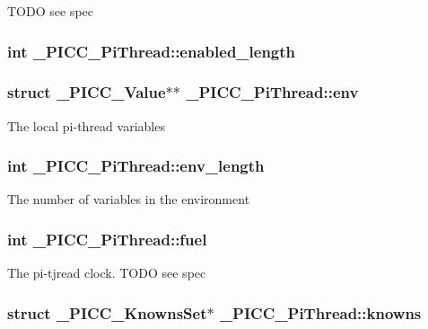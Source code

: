 T\-O\-D\-O see spec \hypertarget{struct__PICC__PiThread_a0443e5525ef66064fbfb5ea4722f0fda}{
\subsubsection[{enabled\-\_\-length}]{\setlength{\rightskip}{0pt plus 5cm}int \-\_\-\-P\-I\-C\-C\-\_\-\-Pi\-Thread\-::enabled\-\_\-length}}\label{struct__PICC__PiThread_a0443e5525ef66064fbfb5ea4722f0fda}
\hypertarget{struct__PICC__PiThread_a2ad1dca93b2d7b8227d400a5f0fd5003}{
\subsubsection[{env}]{\setlength{\rightskip}{0pt plus 5cm}struct {\bf \-\_\-\-P\-I\-C\-C\-\_\-\-Value}$\ast$$\ast$ \-\_\-\-P\-I\-C\-C\-\_\-\-Pi\-Thread\-::env}}\label{struct__PICC__PiThread_a2ad1dca93b2d7b8227d400a5f0fd5003}
The local pi-\/thread variables \hypertarget{struct__PICC__PiThread_a8fce59a9f1cf87c981af443cba62fb86}{
\subsubsection[{env\-\_\-length}]{\setlength{\rightskip}{0pt plus 5cm}int \-\_\-\-P\-I\-C\-C\-\_\-\-Pi\-Thread\-::env\-\_\-length}}\label{struct__PICC__PiThread_a8fce59a9f1cf87c981af443cba62fb86}
The number of variables in the environment \hypertarget{struct__PICC__PiThread_ade9af8e74e38619a991f6881a0ff2e1e}{
\subsubsection[{fuel}]{\setlength{\rightskip}{0pt plus 5cm}int \-\_\-\-P\-I\-C\-C\-\_\-\-Pi\-Thread\-::fuel}}\label{struct__PICC__PiThread_ade9af8e74e38619a991f6881a0ff2e1e}
The pi-\/tjread clock. T\-O\-D\-O see spec \hypertarget{struct__PICC__PiThread_aa1110c046d4ccd425e20e5a99de6dbac}{
\subsubsection[{knowns}]{\setlength{\rightskip}{0pt plus 5cm}struct {\bf \-\_\-\-P\-I\-C\-C\-\_\-\-Knowns\-Set}$\ast$ \-\_\-\-P\-I\-C\-C\-\_\-\-Pi\-Thread\-::knowns}}\label{struct__PICC__PiThread_aa1110c046d4ccd425e20e5a99de6dbac}
